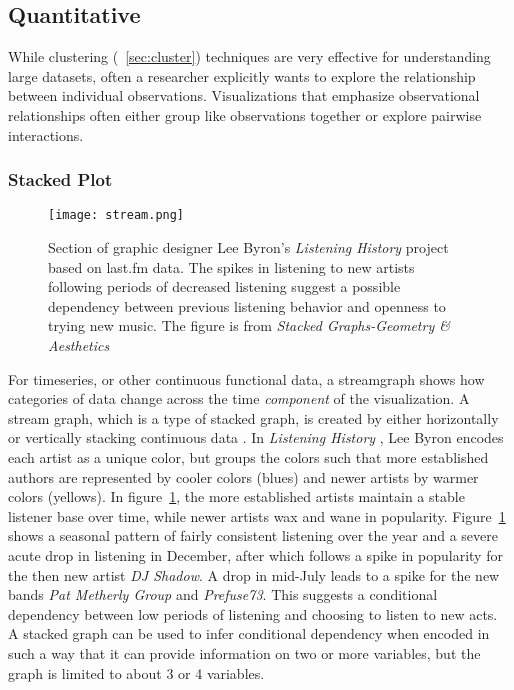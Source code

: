 \documentclass[../main.text]{subfiles}
\begin{document}
\subsection{Quantitative}

While clustering (~\ref{sec:cluster}) techniques are very effective for understanding large datasets, often a researcher explicitly wants to explore the relationship between individual observations. Visualizations that emphasize observational relationships often either group like observations together or explore pairwise interactions. 


\subsubsection{Stacked Plot}
\label{sec:stacked}
\begin{figure}[H]
\texttt{[image: stream.png]}
\caption{Section of graphic designer Lee Byron's \textit{Listening History} \cite{fry_what_????,l._byron_stacked_2008} project based on last.fm data. The spikes in listening to new artists following periods of decreased listening suggest a possible dependency between previous listening behavior and openness to trying new music. The figure is from \textit{Stacked Graphs-Geometry \& Aesthetics} \cite{l._byron_stacked_2008}
}
\label{fig:streamgraph}
\end{figure}

For timeseries, or other continuous functional data, a streamgraph shows how categories of data change across the time \textit{component} of the visualization. A stream graph, which is a type of stacked graph, is created by either horizontally or vertically stacking continuous data \cite{Heer:2010:TTV:1743546.1743567, l._byron_stacked_2008}. In \textit{Listening History} \cite{fry_what_????,l._byron_stacked_2008}, Lee Byron encodes each artist as a unique color, but groups the colors such that more established authors are represented by cooler colors (blues) and newer artists by warmer colors (yellows). In figure~\ref{fig:streamgraph}, the more established artists maintain a stable listener base over time, while newer artists wax and wane in popularity. Figure~\ref{fig:streamgraph} shows a seasonal pattern of fairly consistent listening over the year and a severe acute drop in listening in December, after which follows a spike in popularity for the then new artist \textit{DJ Shadow}. A drop in mid-July leads to a spike for the new bands \textit{Pat Metherly Group} and \textit{Prefuse73}. This suggests a conditional dependency between low periods of listening and choosing to listen to new acts. A stacked graph can be used to infer conditional dependency when encoded in such a way that it can provide information on two or more variables, but the graph is limited to about 3 or 4 variables. 
\end{document}
